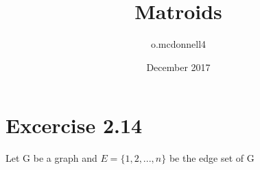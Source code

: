 \documentclass{article}
\title{Matroids}
\author{o.mcdonnell4 }
\date{December 2017}
\begin{document}
\maketitle

\section{Excercise 2.14}
Let G be a graph
and $ E = \{ 1,2, ..., n \}$ be the edge set of G

\mathbb
\end{document}
